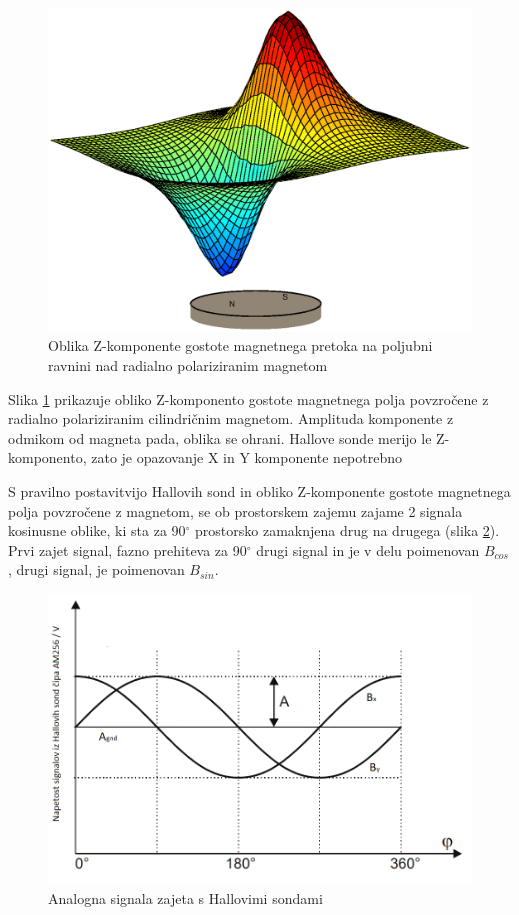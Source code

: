 \begin{figure}[ht]
	\centering
	\includegraphics[width=0.9\columnwidth]{./Slike/polje_brez_ravnine.eps}
	\caption{Oblika Z-komponente gostote magnetnega pretoka na poljubni ravnini nad radialno polariziranim magnetom}
	\label{polje_brez_ravnine}
\end{figure}

Slika \ref{polje_brez_ravnine}  prikazuje obliko Z-komponento gostote magnetnega polja povzročene z radialno polariziranim cilindričnim magnetom. Amplituda komponente z odmikom od magneta pada, oblika se ohrani.
Hallove sonde merijo le Z- komponento, zato je opazovanje X in Y komponente nepotrebno

S pravilno postavitvijo Hallovih sond in obliko Z-komponente gostote magnetnega polja povzročene z magnetom, se ob prostorskem zajemu zajame 2 signala kosinusne oblike, ki sta za 90$^\circ$ prostorsko zamaknjena
drug na drugega (slika \ref{BxBy}). Prvi zajet signal,  fazno prehiteva za 90$^\circ$ drugi signal in je v delu poimenovan $B_{cos}$, drugi signal, je poimenovan $B_{sin}$.
\begin{figure}[ht]
	\centering
	\includegraphics[width=0.75\columnwidth]{./Slike/BxBy.png}
	\caption{Analogna signala zajeta s Hallovimi sondami \cite{AM8192}}
	\label{BxBy}
\end{figure}

